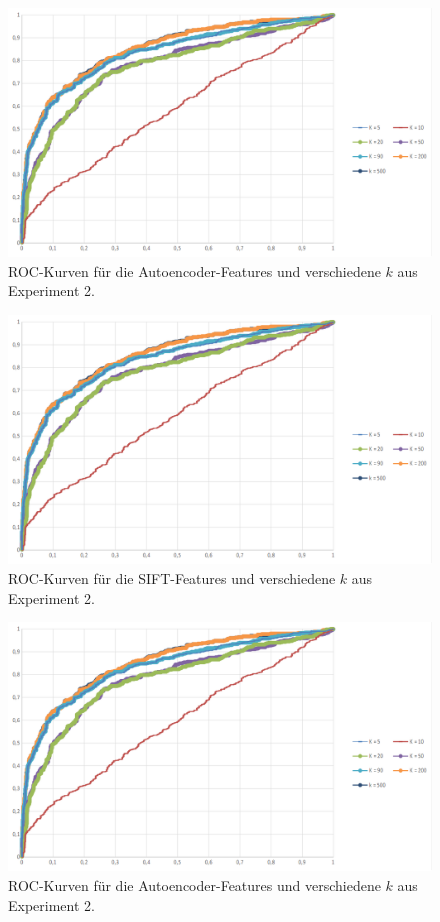 \begin{figure}
	\centering
	\includegraphics[scale=0.4]{images/roc_ph.png}
	\caption{ROC-Kurven für die Autoencoder-Features und verschiedene $k$ aus Experiment 2.}
	\label{img:roc4}
\end{figure}

\begin{figure}
	\centering
	\includegraphics[scale=0.4]{images/roc_ph.png}
	\caption{ROC-Kurven für die SIFT-Features und verschiedene $k$ aus Experiment 2.}
	\label{img:roc5}
\end{figure}

\begin{figure}
	\centering
    \includegraphics[scale=0.4]{images/roc_ph.png}
    \caption{ROC-Kurven für die Autoencoder-Features und verschiedene $k$ aus Experiment 2.}
    \label{img:roc6}
\end{figure}

